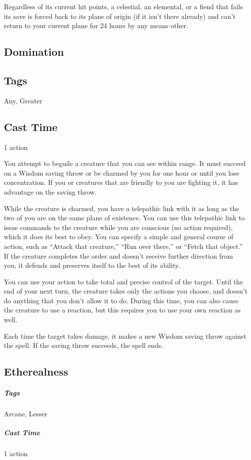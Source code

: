 Regardless of its current hit points, a celestial, an elemental, or a fiend that fails its save is forced back to its plane of origin (if it isn’t there already) and can’t return to your current plane for 24 hours by any means other.

\subsection{Domination}
\subsection*{Tags} Any, Greater
\subsection*{Cast Time} 1 action

You attempt to beguile a creature that you can see within range. It must succeed on a Wisdom saving throw or be charmed by you for one hour or until you lose concentration. If you or creatures that are friendly to you are fighting it, it has advantage on the saving throw.

While the creature is charmed, you have a telepathic link with it as long as the two of you are on the same plane of existence. You can use this telepathic link to issue commands to the creature while you are conscious (no action required), which it does its best to obey. You can specify a simple and general course of action, such as “Attack that creature,” “Run over there,” or “Fetch that object.” If the creature completes the order and doesn’t receive further direction from you, it defends and preserves itself to the best of its ability.

You can use your action to take total and precise control of the target. Until the end of your next turn, the creature takes only the actions you choose, and doesn’t do anything that you don’t allow it to do. During this time, you can also cause the creature to use a reaction, but this requires you to use your own reaction as well.

Each time the target takes damage, it makes a new Wisdom saving throw against the spell. If the saving throw succeeds, the spell ends.

\subsection{Etherealness}
\subparagraph*{Tags} Arcane, Lesser
\subparagraph*{Cast Time} 1 action

